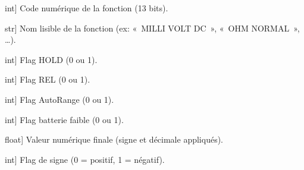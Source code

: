 \documentclass[letterpaper,10pt,french]{sphinxmanual}
\begin{document}
\begin{fulllineitems}
\begin{description}
\sphinxlineitem{unit}{[}int{]}
\sphinxAtStartPar
Code numérique de la fonction (13 bits).

\sphinxlineitem{unit\_name}{[}str{]}
\sphinxAtStartPar
Nom lisible de la fonction (ex: « MILLI VOLT DC », « OHM NORMAL », …).

\sphinxlineitem{data\_hold\_mode}{[}int{]}
\sphinxAtStartPar
Flag HOLD (0 ou 1).

\sphinxlineitem{relative\_mode}{[}int{]}
\sphinxAtStartPar
Flag REL (0 ou 1).

\sphinxlineitem{auto\_ranging}{[}int{]}
\sphinxAtStartPar
Flag AutoRange (0 ou 1).

\sphinxlineitem{low\_battery}{[}int{]}
\sphinxAtStartPar
Flag batterie faible (0 ou 1).

\sphinxlineitem{value}{[}float{]}
\sphinxAtStartPar
Valeur numérique finale (signe et décimale appliqués).

\sphinxlineitem{sign}{[}int{]}
\sphinxAtStartPar
Flag de signe (0 = positif, 1 = négatif).

\end{description}

\begin{fulllineitems}
\label{\detokenize{api/hardware.devices:hardware.devices.owon_multimeter.OwonMultimeterData.raw_data}}
\pysigstartsignatures
\pysigline
{}
\pysigstopsignatures
\end{fulllineitems}


\begin{fulllineitems}
\label{\detokenize{api/hardware.devices:hardware.devices.owon_multimeter.OwonMultimeterData.decimal_places}}
\pysigstartsignatures
\pysigline
{}
\pysigstopsignatures
\end{fulllineitems}



\end{fulllineitems}
\end{document}
